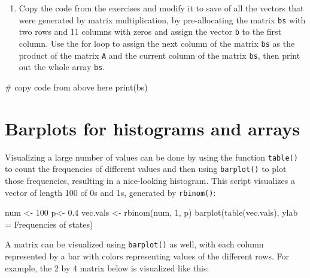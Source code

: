 \documentclass[
  letterpaper,
  DIV=11,
  numbers=noendperiod]{scrreprt}
\newenvironment{Shaded}{\begin{snugshade}}{\end{snugshade}}
\newcommand{\NormalTok}[1]{\textcolor[rgb]{0.00,0.23,0.31}{#1}}
\providecommand{\tightlist}{%
  \setlength{\itemsep}{0pt}\setlength{\parskip}{0pt}}\usepackage{longtable,booktabs,array}
\begin{document}
\begin{enumerate}
\def\labelenumi{\arabic{enumi}.}
\setcounter{enumi}{3}
\tightlist
\item
  Copy the code from the exercises and modify it to save of all the
  vectors that were generated by matrix multiplication, by
  pre-allocating the matrix \texttt{bs} with two rows and 11 columns
  with zeros and assign the vector \texttt{b} to the first column. Use
  the for loop to assign the next column of the matrix \texttt{bs} as
  the product of the matrix \texttt{A} and the current column of the
  matrix \texttt{bs}, then print out the whole array \texttt{bs}.
\end{enumerate}

\begin{Shaded}
\begin{Highlighting}[]
\NormalTok{\# copy code from above here}
\NormalTok{print(bs)}
\end{Highlighting}
\end{Shaded}

\hypertarget{barplots-for-histograms-and-arrays}{%
\section*{Barplots for histograms and
arrays}\label{barplots-for-histograms-and-arrays}}


Visualizing a large number of values can be done by using the function
\texttt{table()} to count the frequencies of different values and then
using \texttt{barplot()} to plot those frequencies, resulting in a
nice-looking histogram. This script visualizes a vector of length 100 of
0s and 1s, generated by \texttt{rbinom()}:

\begin{Shaded}
\begin{Highlighting}[]
\NormalTok{num \textless{}{-} 100}
\NormalTok{p\textless{}{-} 0.4}
\NormalTok{vec.vals \textless{}{-} rbinom(num, 1, p)}
\NormalTok{barplot(table(vec.vals), ylab = \textquotesingle{}Frequencies of states\textquotesingle{})}
\end{Highlighting}
\end{Shaded}

A matrix can be visualized using \texttt{barplot()} as well, with each
column represented by a bar with colors representing values of the
different rows. For example, the 2 by 4 matrix below is visualized like
this:
\end{document}
